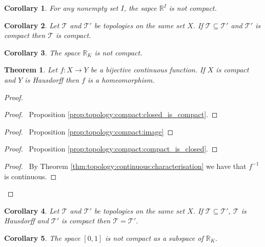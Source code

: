 \documentclass{report}
\let\qed\relax
\newtheorem{thm}[lm]{Theorem}
\newtheorem{cor}{Corollary}[lm]
\theoremstyle{definition}
\begin{document}
  \begin{cor}
  	For any nonempty set $I$,
    the sapce $\mathbb{R}^I$ is not compact.
  \end{cor}

	\begin{cor}
		Let $\mathcal{T}$ and $\mathcal{T}'$ be topologies on the same
set $X$. If $\mathcal{T} \subseteq \mathcal{T}'$ and
$\mathcal{T}'$ is compact then $\mathcal{T}$ is compact.
	\end{cor}

        \begin{cor}
          The space $\mathbb{R}_K$ is not compact.
        \end{cor}

  \begin{thm}
    \label{thm:topology:compact:homeomorphism}
    Let $f : X \rightarrow Y$ be a bijective continuous function. If $X$ is
    compact and $Y$ is Hausdorff then $f$ is a homeomorphism.
  \end{thm}

  \begin{proof}
    \pf
    \begin{proof}
      \pf\ Proposition \ref{prop:topology:compact:closed_is_compact}.
    \end{proof}
    \begin{proof}
      \pf\ Proposition \ref{prop:topology:compact:image}
    \end{proof}
    \begin{proof}
      \pf\ Proposition \ref{prop:topology:compact:compact_is_closed}.
    \end{proof}
    \qedstep
    \begin{proof}
      \pf\ By Theorem
      \ref{thm:topology:continuous:characterisation}
      we have that      $f^{-1}$ is continuous.
    \end{proof}
    \qed
  \end{proof}

  \begin{cor}
  	\label{cor:topology:compact_hausdorff:finer_coarser}
	 Let $\mathcal{T}$ and $\mathcal{T}'$ be topologies on the same set $X$. If $\mathcal{T} \subseteq \mathcal{T}'$, $\mathcal{T}$ is Hausdorff and $\mathcal{T}'$ is compact then $\mathcal{T} = \mathcal{T}'$.
  \end{cor}

  \begin{cor}
    \label{cor:topology:compact_hausdorff:01K}
    The space $[0,1]$ is not compact as a subspace of $\mathbb{R}_K$.
  \end{cor}
\end{document}

